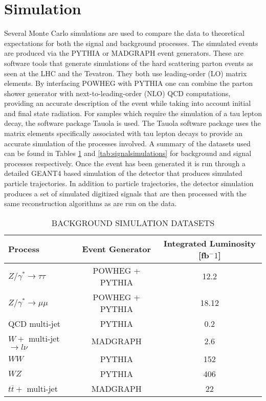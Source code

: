 \section{Simulation}
\label{sec:simulation}
Several Monte Carlo simulations are used to compare the data to theoretical expectations for both the signal and background processes.
The simulated events are produced via the PYTHIA\cite{PYTHIA} or MADGRAPH\cite{MADGRAPH} event generators.
These are software tools that generate simulations of the hard scattering parton events as seen at the LHC and the Tevatron. 
They both use leading-order (LO) matrix elements.
By interfacing POWHEG\cite{POWHEG} with PYTHIA one can combine the parton shower generator with next-to-leading-order (NLO) QCD computations, providing an accurate description of the event while taking into account initial and final state radiation.
For samples which require the simulation of a tau lepton decay, the software package Tauola\cite{TAUOLA} is used.
The Tauola software package uses the matrix elements specifically associated with tau lepton decays to provide an accurate simulation of the processes involved.
A summary of the datasets used can be found in Tables \ref{tab:backgroundsimulations} and \ref{tab:signalsimulations} for background and signal processes respectively. 
Once the event has been generated it is run through a detailed GEANT4 based simulation of the detector that produces simulated particle trajectories\cite{GEANT4}.
In addition to particle trajectories, the detector simulation produces a set of simulated digitized signals that are then processed with the same reconstruction algorithms as are run on the data.

\begin{table}[tpb]
  \begin{center}
    \caption{BACKGROUND SIMULATION DATASETS}
    \label{tab:backgroundsimulations}
    \begin{tabular}{lcc}
      \toprule
      Process & Event Generator & Integrated Luminosity [fb$^-1$]\\
      \midrule
      $Z / \gamma^{*} \rightarrow \tau\tau$ & POWHEG + PYTHIA & 12.2\\
      $Z / \gamma^{*} \rightarrow \mu\mu$ & POWHEG + PYTHIA & 18.12\\
      QCD multi-jet & PYTHIA & 0.2\\
      $W+$ multi-jet $\rightarrow l\nu$ & MADGRAPH & 2.6\\
      $WW$ & PYTHIA & 152\\
      $WZ$ & PYTHIA & 406\\
      $t\overline{t} +$ multi-jet & MADGRAPH & 22\\
      \bottomrule
    \end{tabular}
  \end{center}
\end{table}

